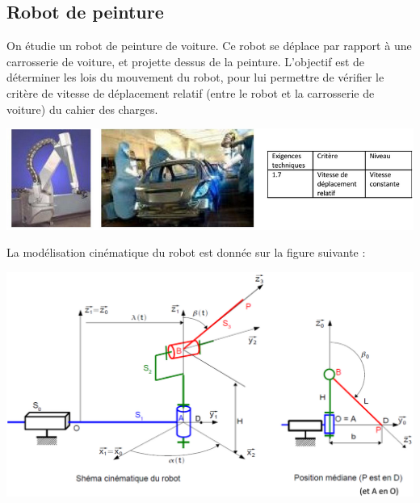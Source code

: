 \documentclass[10pt,fleqn]{article} %
\begin{document}
\begin{multicols}{2}

\section*{Robot de peinture}

\vspace{.25cm}

On étudie un robot de peinture de voiture. Ce robot se déplace par rapport à une carrosserie de voiture, et projette dessus de la peinture. L'objectif est de déterminer les lois du mouvement du robot, pour lui permettre de vérifier le critère de vitesse de déplacement relatif (entre le robot et la carrosserie de voiture) du cahier des charges.

\begin{center}
\includegraphics[width=\linewidth]{images/fig_1}

\end{center}

\vspace{.25cm}


La modélisation cinématique du robot est donnée sur la figure suivante :


\begin{center}
\includegraphics[width=\linewidth]{images/fig_2}
\end{center}



\vspace{.25cm}


\end{multicols}
\end{document}
